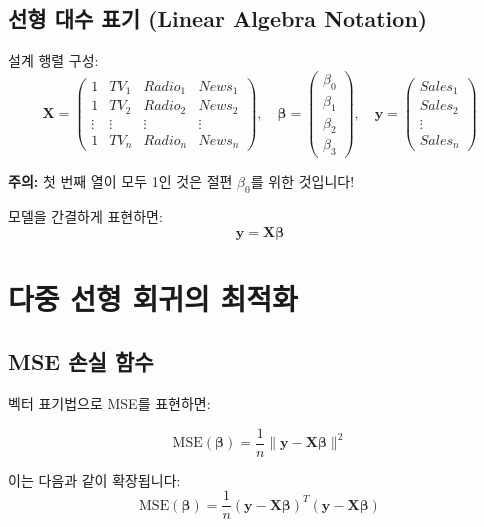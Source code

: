 \documentclass[12pt]{article}
\begin{document}
\subsection{선형 대수 표기 (Linear Algebra Notation)}

설계 행렬 구성:
\begin{equation}
\mathbf{X} = \begin{pmatrix}
1 & TV_1 & Radio_1 & News_1 \\
1 & TV_2 & Radio_2 & News_2 \\
\vdots & \vdots & \vdots & \vdots \\
1 & TV_n & Radio_n & News_n
\end{pmatrix}, \quad
\boldsymbol{\beta} = \begin{pmatrix}
\beta_0 \\
\beta_1 \\
\beta_2 \\
\beta_3
\end{pmatrix}, \quad
\mathbf{y} = \begin{pmatrix}
Sales_1 \\
Sales_2 \\
\vdots \\
Sales_n
\end{pmatrix}
\end{equation}

\textbf{주의:} 첫 번째 열이 모두 1인 것은 절편 $\beta_0$를 위한 것입니다!

모델을 간결하게 표현하면:
\begin{equation}
\mathbf{y} = \mathbf{X}\boldsymbol{\beta}
\end{equation}

\section{다중 선형 회귀의 최적화}

\subsection{MSE 손실 함수}

벡터 표기법으로 MSE를 표현하면:

\begin{equation}
\text{MSE}(\boldsymbol{\beta}) = \frac{1}{n}\|\mathbf{y} - \mathbf{X}\boldsymbol{\beta}\|^2
\end{equation}

이는 다음과 같이 확장됩니다:
\begin{equation}
\text{MSE}(\boldsymbol{\beta}) = \frac{1}{n}(\mathbf{y} - \mathbf{X}\boldsymbol{\beta})^T(\mathbf{y} - \mathbf{X}\boldsymbol{\beta})
\end{equation}
\end{document}

